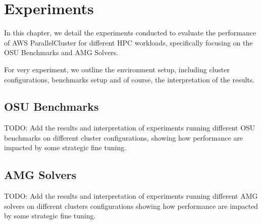\chapter{Experiments}

In this chapter, we detail the experiments conducted to evaluate the performance of AWS ParallelCluster for
different HPC workloads, specifically focusing on the OSU Benchmarks and AMG Solvers.

For very experiment, we outline the environment setup, including cluster configurations, benchmarks setup and
of course, the interpretation of the results.

\section{OSU Benchmarks}
\label{sec:osu-benchmarks}

TODO: Add the results and interpretation of experiments running different OSU benchmarks on different cluster
configurations, showing how performance are impacted by some strategic fine tuning.

\section{AMG Solvers}
\label{sec:amg-solvers}

TODO: Add the results and interpretation of experiments running different AMG solvers on different clusters
configurations showing how performance are impacted by some strategic fine tuning.
